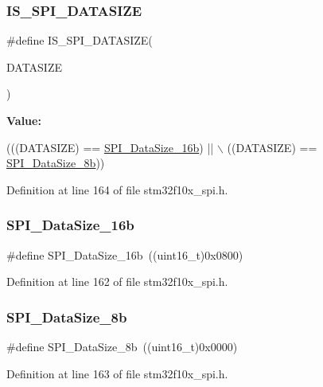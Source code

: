 \subsubsection{\texorpdfstring{I\+S\+\_\+\+S\+P\+I\+\_\+\+D\+A\+T\+A\+S\+I\+ZE}{IS\_SPI\_DATASIZE}}
{\footnotesize\ttfamily \#define I\+S\+\_\+\+S\+P\+I\+\_\+\+D\+A\+T\+A\+S\+I\+ZE(\begin{DoxyParamCaption}\item[{}]{D\+A\+T\+A\+S\+I\+ZE }\end{DoxyParamCaption})}

{\bfseries Value\+:}
\begin{DoxyCode}
(((DATASIZE) == \hyperlink{group___s_p_i__data__size_ga8af2c8ca5c2162423531ebf560e0a41d}{SPI\_DataSize\_16b}) || \(\backslash\)
                                   ((DATASIZE) == \hyperlink{group___s_p_i__data__size_ga56721814a935922b6ca7c49060509765}{SPI\_DataSize\_8b}))
\end{DoxyCode}


Definition at line 164 of file stm32f10x\+\_\+spi.\+h.

\mbox{\label{group___s_p_i__data__size_ga8af2c8ca5c2162423531ebf560e0a41d}} 
\subsubsection{\texorpdfstring{S\+P\+I\+\_\+\+Data\+Size\+\_\+16b}{SPI\_DataSize\_16b}}
{\footnotesize\ttfamily \#define S\+P\+I\+\_\+\+Data\+Size\+\_\+16b~((uint16\+\_\+t)0x0800)}



Definition at line 162 of file stm32f10x\+\_\+spi.\+h.

\mbox{\label{group___s_p_i__data__size_ga56721814a935922b6ca7c49060509765}} 
\subsubsection{\texorpdfstring{S\+P\+I\+\_\+\+Data\+Size\+\_\+8b}{SPI\_DataSize\_8b}}
{\footnotesize\ttfamily \#define S\+P\+I\+\_\+\+Data\+Size\+\_\+8b~((uint16\+\_\+t)0x0000)}



Definition at line 163 of file stm32f10x\+\_\+spi.\+h.

